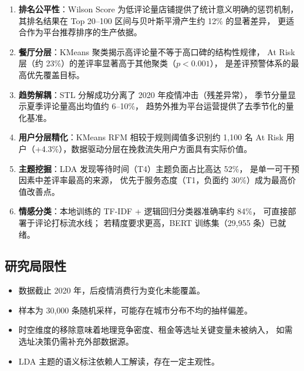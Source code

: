 \documentclass[12pt, a4paper]{article}
\begin{document}
\begin{enumerate}[leftmargin=2em]
  \item \textbf{排名公平性}：Wilson Score 为低评论量店铺提供了统计意义明确的惩罚机制，
        其排名结果在 Top 20--100 区间与贝叶斯平滑产生约 12\% 的显著差异，
        更适合作为平台推荐排序的生产依据。

  \item \textbf{餐厅分层}：KMeans 聚类揭示高评论量不等于高口碑的结构性规律，
        At Risk 层（约 23\%）的差评率显著高于其他聚类（$p < 0.001$），
        是差评预警体系的最高优先覆盖目标。

  \item \textbf{趋势解耦}：STL 分解成功分离了 2020 年疫情冲击（残差异常），
        季节分量显示夏季评论量高出均值约 6--10\%，
        趋势外推为平台运营提供了去季节化的量化基准。

  \item \textbf{用户分层精化}：KMeans RFM 相较于规则阈值多识别约 1,100 名
        At Risk 用户（+4.3\%），数据驱动分层在挽救流失用户方面具有实际价值。

  \item \textbf{主题挖掘}：LDA 发现等待时间（T4）主题负面占比高达 52\%，
        是单一可干预因素中差评率最高的来源，
        优先于服务态度（T1，负面约 30\%）成为最高价值改善点。

  \item \textbf{情感分类}：本地训练的 TF-IDF + 逻辑回归分类器准确率约 84\%，
        可直接部署于评论打标流水线；
        若精度要求更高，BERT 训练集（29,955 条）已就绪。
\end{enumerate}

\subsection{研究局限性}

\begin{itemize}[leftmargin=2em]
  \item 数据截止 2020 年，后疫情消费行为变化未能覆盖。
  \item 样本为 30,000 条随机采样，可能存在城市分布不均的抽样偏差。
  \item 时空维度的移除意味着地理竞争密度、租金等选址关键变量未被纳入，
        如需选址决策仍需补充外部数据源。
  \item LDA 主题的语义标注依赖人工解读，存在一定主观性。
\end{itemize}
\end{document}
